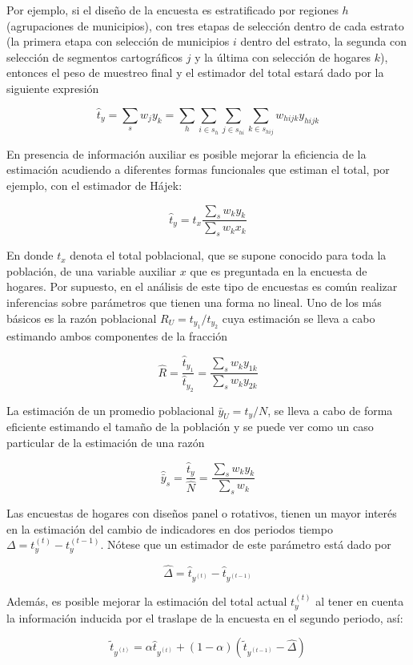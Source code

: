 Por ejemplo, si el diseño de la encuesta es estratificado por regiones \(h\) (agrupaciones de municipios), con tres etapas de selección dentro de cada estrato (la primera etapa con selección de municipios \(i\) dentro del estrato, la segunda con selección de segmentos cartográficos \(j\) y la última con selección de hogares \(k\)), entonces el peso de muestreo final y el estimador del total estará dado por la siguiente expresión

\[
\hat{t}_y = \sum_s w_j y_k = \sum_h \sum_{i \in s_h} \sum_{j \in s_{hi}} \sum_{k \in s_{hij}} w_{hijk} y_{hijk}
\]

En presencia de información auxiliar es posible mejorar la eficiencia de la estimación acudiendo a diferentes formas funcionales que estiman el total, por ejemplo, con el estimador de Hájek:

\[
\hat{t}_y = t_x \frac{\sum_s w_k y_k}{\sum_s w_k x_k}
\]

En donde \(t_x\) denota el total poblacional, que se supone conocido para toda la población, de una variable auxiliar \(x\) que es preguntada en la encuesta de hogares. Por supuesto, en el análisis de este tipo de encuestas es común realizar inferencias sobre parámetros que tienen una forma no lineal. Uno de los más básicos es la razón poblacional \(R_U = t_{y_1} / t_{y_2}\) cuya estimación se lleva a cabo estimando ambos componentes de la fracción

\[
\hat{R}= \frac{\hat{t}_{y_1}}{\hat{t}_{y_2}}
= \frac{\sum_s w_k y_{1k}} {\sum_s w_k y_{2k}}
\]

La estimación de un promedio poblacional \(\bar{y}_U = t_y / N\), se lleva a cabo de forma eficiente estimando el tamaño de la población y se puede ver como un caso particular de la estimación de una razón

\[
\hat{\bar{y}}_s= \frac{\hat{t}_y}{\hat{N}} 
= \frac{\sum_s w_k y_k}{\sum_s w_k}
\]

Las encuestas de hogares con diseños panel o rotativos, tienen un mayor interés en la estimación del cambio de indicadores en dos periodos tiempo \(\Delta = t_y^{(t)} - t_y^{(t-1)}\). Nótese que un estimador de este parámetro está dado por

\[
\hat{\Delta} = \hat{t}_{y^{(t)}} - \hat{t}_{y^{(t-1)}}
\]

Además, es posible mejorar la estimación del total actual \(t_y^{(t)}\) al tener en cuenta la información inducida por el traslape de la encuesta en el segundo periodo, así:

\[
\tilde{t}_{y^{(t)}} = \alpha \hat{t}_{y^{(t)}} 
+ (1 -\alpha) (\tilde{t}_{y^{(t-1)}} - \hat{\Delta})
\]

